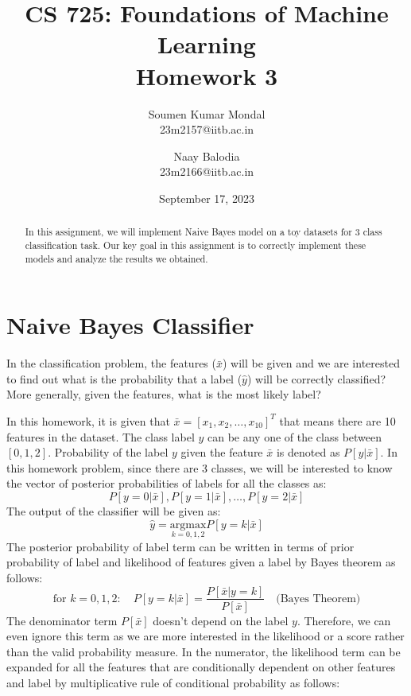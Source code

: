 \documentclass[12pt, a4paper, twoside]{article}
\title{\vspace{-0.5in}\textbf{CS 725: Foundations of Machine Learning \\
Homework 3}}
\author{Soumen Kumar Mondal\\
23m2157@iitb.ac.in \and
Naay Balodia\\
23m2166@iitb.ac.in}
\date{September  17, 2023}
\begin{document}
\maketitle
\thispagestyle{fancy}
\begin{abstract}
In this assignment, we will implement Naive Bayes model on a toy datasets for 3 class classification task. Our key goal in this assignment is to correctly implement these models and analyze the results we obtained.
\end{abstract}
\section{Naive Bayes Classifier}
In the classification problem, the features ($\bar{x}$) will be given and we are interested to find out what is the probability that a label ($\hat{y}$) will be correctly classified? More generally, given the features, what is the most likely label?
\par
In this homework, it is given that $\bar{x} = [x_1, x_2, \ldots, x_{10}]^T$ that means there are 10 features in the dataset. The class label $y$ can be any one of the class between $[0, 1, 2]$. Probability of the label $y$ given the feature $\bar{x}$ is denoted as $P [y | \bar{x}]$. In this homework problem, since there are 3 classes, we will be interested to know the vector of posterior probabilities of labels for all the classes as:
\begin{equation}
		P [ y = 0 | \bar{x}], P [ y = 1 | \bar{x}], \dots , P [ y = 2 | \bar{x}]
\end{equation}
The output of the classifier will be given as:
\begin{equation}
	\hat{y} = \underset{k = 0, 1, 2}{\text{argmax}} P[ y  = k | \bar{x}] 
\end{equation}
The posterior probability of label term can be written in terms of prior probability of label and likelihood of features given a label by Bayes theorem as follows:
\begin{equation}
	\text{for } k = 0, 1, 2: \quad P [y = k | \bar{x}] = \frac{P [\bar{x} | y = k]}{P [\bar{x}]} \quad \text{(Bayes Theorem)}
\end{equation}
The denominator term $P [\bar{x}]$ doesn't depend on the label $y$. Therefore, we can even ignore this term as we are more interested in the likelihood or a score rather than the valid probability measure. In the numerator, the likelihood term can be expanded for all the features that are conditionally dependent on other features and label by multiplicative rule of conditional probability as follows:
\end{document}
